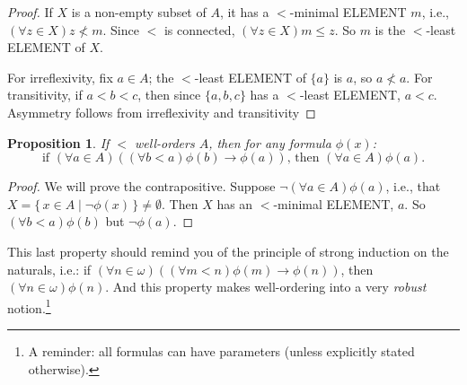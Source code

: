 \documentclass[10pt,a4paper]{article}
\newcommand*{\olup}[1]{\MakeUppercase{#1}}
\theoremstyle{plain}
\newtheorem{prop}[thm]{Proposition}
\theoremstyle{definition}
\theoremstyle{remark}
\newcommand*{\ollabel}[1]{\label{#1}}
\providecommand{\lif}{\mathbin{\rightarrow}}
\providecommand{\Setabs}[2]{\{\, #1 \mid #2 \,\}}
\begin{document}
\begin{proof}
If $X$ is a non-empty subset of $A$, it has a $<$-minimal \olup{element}
$m$, i.e., $(\forall z \in X)z \nless m$. Since $<$ is connected,
$(\forall z \in X)m \leq z$. So $m$ is the $<$-least \olup{element} of $X$.

For irreflexivity, fix $a \in A$; the $<$-least \olup{element} of $\{a\}$ is $a$, so $a \nless a$. For transitivity, if $a < b < c$, then
since $\{a, b, c\}$ has a $<$-least \olup{element}, $a < c$. Asymmetry
follows from irreflexivity and transitivity
\end{proof}

\begin{prop}\ollabel{propwoinduction}
If $<$ well-orders $A$, then for any formula $\phi(x)$:
\[
	\text{if }(\forall a \in A)((\forall b < a)\phi(b) \lif 
		\phi(a))\text{, then }(\forall a \in A)\phi(a).
\]
\end{prop}

\begin{proof}
We will prove the contrapositive. Suppose $\lnot(\forall a \in
A)\phi(a)$, i.e., that $X = \Setabs{x \in A}{\lnot\phi(x)} \neq
\emptyset$. Then $X$ has an $<$-minimal \olup{element}, $a$. So $(\forall
b < a)\phi(b)$ but $\lnot \phi(a)$. \end{proof}\noindent This last
property should remind you of the principle of strong induction on the
naturals, i.e.: if $(\forall n \in \omega)((\forall m < n)\phi(m)
\lif \phi(n))$, then $(\forall n \in \omega)\phi(n)$. And this
property makes well-ordering into a very \emph{robust} notion.\footnote{A reminder: all formulas can have parameters (unless explicitly stated otherwise).} 
\end{document}
